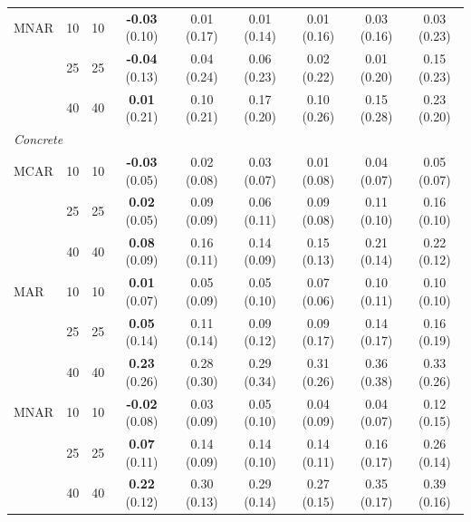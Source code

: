 \begin{tabular}{llrcccccc}
MNAR & 10 & 10 & \textbf{-0.03} (0.10) & 0.01 (0.17) & 0.01 (0.14) & 0.01 (0.16) & 0.03 (0.16) & 0.03 (0.23)\\
 & 25 & 25 & \textbf{-0.04} (0.13) & 0.04 (0.24) & 0.06 (0.23) & 0.02 (0.22) & 0.01 (0.20) & 0.15 (0.23)\\
 & 40 & 40 & \textbf{0.01} (0.21) & 0.10 (0.21) & 0.17 (0.20) & 0.10 (0.26) & 0.15 (0.28) & 0.23 (0.20)\\
\midrule
\multicolumn{9}{l}{\textit{Concrete}}\\
MCAR & 10 & 10 & \textbf{-0.03} (0.05) & 0.02 (0.08) & 0.03 (0.07) & 0.01 (0.08) & 0.04 (0.07) & 0.05 (0.07)\\
 & 25 & 25 & \textbf{0.02} (0.05) & 0.09 (0.09) & 0.06 (0.11) & 0.09 (0.08) & 0.11 (0.10) & 0.16 (0.10)\\
 & 40 & 40 & \textbf{0.08} (0.09) & 0.16 (0.11) & 0.14 (0.09) & 0.15 (0.13) & 0.21 (0.14) & 0.22 (0.12)\\
MAR & 10 & 10 & \textbf{0.01} (0.07) & 0.05 (0.09) & 0.05 (0.10) & 0.07 (0.06) & 0.10 (0.11) & 0.10 (0.10)\\
 & 25 & 25 & \textbf{0.05} (0.14) & 0.11 (0.14) & 0.09 (0.12) & 0.09 (0.17) & 0.14 (0.17) & 0.16 (0.19)\\
 & 40 & 40 & \textbf{0.23} (0.26) & 0.28 (0.30) & 0.29 (0.34) & 0.31 (0.26) & 0.36 (0.38) & 0.33 (0.26)\\
MNAR & 10 & 10 & \textbf{-0.02} (0.08) & 0.03 (0.09) & 0.05 (0.10) & 0.04 (0.09) & 0.04 (0.07) & 0.12 (0.15)\\
 & 25 & 25 & \textbf{0.07} (0.11) & 0.14 (0.09) & 0.14 (0.10) & 0.14 (0.11) & 0.16 (0.17) & 0.26 (0.14)\\
 & 40 & 40 & \textbf{0.22} (0.12) & 0.30 (0.13) & 0.29 (0.14) & 0.27 (0.15) & 0.35 (0.17) & 0.39 (0.16)\\
\bottomrule
\end{tabular}
